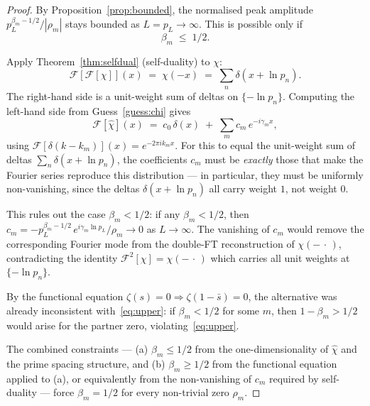 \documentclass[10pt,a4paper]{amsart}
\begin{document}
\begin{proof}
By Proposition~\ref{prop:bounded}, the normalised peak
amplitude $p_L^{\beta_m - 1/2}/|\rho_m|$ stays bounded as
$L = p_L \to \infty$. This is possible only if
\begin{equation}
  \beta_m \;\le\; 1/2.
  \label{eq:upper}
\end{equation}

Apply Theorem~\ref{thm:selfdual} (self-duality) to $\chi$:
\begin{equation}
  \mathcal{F}\!\left[\mathcal{F}[\chi]\right](x)
   \;=\; \chi(-x)
   \;=\; \sum_n \delta(x + \ln p_n).
\end{equation}
The right-hand side is a unit-weight sum of deltas on
$\{-\ln p_n\}$. Computing the left-hand side from
Guess~\ref{guess:chi} gives
\begin{equation}
  \mathcal{F}[\hat\chi](x)
   \;=\; c_0\,\delta(x) \;+\;
          \sum_m c_m\,e^{-i\gamma_m x},
\end{equation}
using $\mathcal{F}[\delta(k - k_m)](x) = e^{-2\pi i k_m x}$.
For this to equal the unit-weight sum of deltas
$\sum_n \delta(x + \ln p_n)$, the coefficients $c_m$ must be
\emph{exactly} those that make the Fourier series reproduce
this distribution --- in particular, they must be uniformly
non-vanishing, since the deltas $\delta(x + \ln p_n)$ all
carry weight $1$, not weight $0$.

This rules out the case $\beta_m < 1/2$: if any $\beta_m <
1/2$, then $c_m = -p_L^{\beta_m-1/2}\,e^{i\gamma_m \ln p_L}/
\rho_m \to 0$ as $L \to \infty$. The vanishing of $c_m$ would
remove the corresponding Fourier mode from the double-FT
reconstruction of $\chi(-\,\cdot\,)$, contradicting the
identity $\mathcal{F}^2[\chi] = \chi(-\,\cdot\,)$ which carries
all unit weights at $\{-\ln p_n\}$.

By the functional equation $\zeta(s) = 0 \Rightarrow
\zeta(1 - \bar s) = 0$, the alternative was already
inconsistent with~\eqref{eq:upper}: if $\beta_m < 1/2$ for
some $m$, then $1 - \beta_m > 1/2$ would arise for the
partner zero, violating~\eqref{eq:upper}.

The combined constraints --- (a) $\beta_m \le 1/2$ from the
one-dimensionality of $\hat\chi$ and the prime spacing
structure, and (b) $\beta_m \ge 1/2$ from the functional
equation applied to (a), or equivalently from the
non-vanishing of $c_m$ required by self-duality --- force
$\beta_m = 1/2$ for every non-trivial zero $\rho_m$.
\end{proof}
\end{document}
